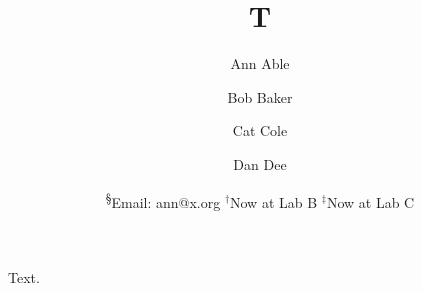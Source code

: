 \documentclass{article}
\title{T}
\author[1,§]{Ann Able}
\author[1,$\dagger$]{Bob Baker}
\author[1,\myD]{Cat Cole}
\author[1]{Dan Dee}
\affil[1]{Univ A}
\date{\textsuperscript{§}Email: ann@x.org \quad $^\dagger$Now at Lab B \quad $^\ddag$Now at Lab C}
\begin{document}
\maketitle
Text.
\end{document}
